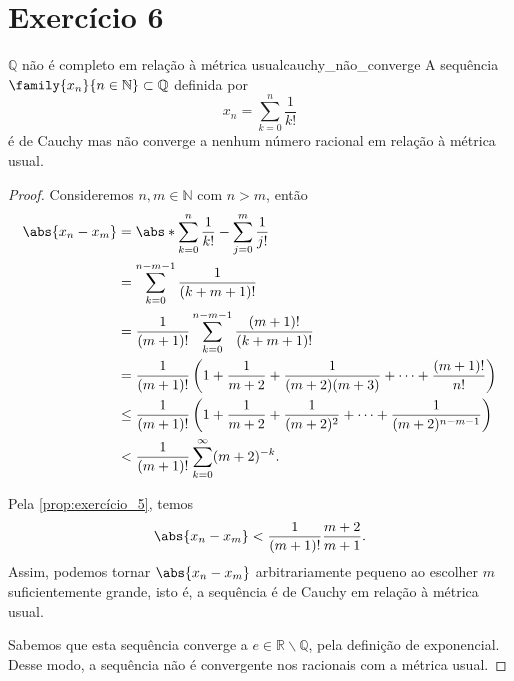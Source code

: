 \section*{Exercício 6}
\begin{proposition}{\(\mathbb{Q}\) não é completo em relação à métrica usual}{cauchy_não_converge}
    A sequência \(\family{x_n}{n\in \mathbb{N}}\subset \mathbb{Q}\) definida por
    \begin{equation*}
        x_n = \sum_{k = 0}^n \frac{1}{k!}
    \end{equation*}
    é de Cauchy mas não converge a nenhum número racional em relação à métrica usual.
\end{proposition}
\begin{proof}
    Consideremos \(n,m \in \mathbb{N}\) com \(n > m\), então
    \begin{align*}
        \abs{x_n - x_m} &= \abs*{\sum_{k=0}^{n}\frac{1}{k!} - \sum_{j = 0}^m\frac{1}{j!}}\\
                        &= \sum_{k=0}^{n-m-1} \frac{1}{(k+m+1)!}\\
                        &= \frac{1}{(m+1)!} \sum_{k=0}^{n-m-1} \frac{(m+1)!}{(k+m+1)!}\\
                        &= \frac{1}{(m+1)!} \left(1 + \frac{1}{m+2} + \frac{1}{(m+2)(m+3)} + \dots + \frac{(m+1)!}{n!}\right)\\
                        &\leq \frac{1}{(m+1)!}\left(1 + \frac{1}{m+2} + \frac{1}{(m+2)^2} + \dots + \frac{1}{(m+2)^{n-m-1}}\right)\\
                        &<\frac{1}{(m+1)!} \sum_{k = 0}^\infty (m+2)^{-k}.
    \end{align*}

    Pela \cref{prop:exercício_5}, temos
    \begin{equation*}
        \abs{x_n - x_m} < \frac{1}{(m+1)!}\frac{m + 2}{m + 1}.
    \end{equation*}
    Assim, podemos tornar \(\abs{x_n - x_m}\) arbitrariamente pequeno ao escolher \(m\) suficientemente grande, isto é, a sequência é de Cauchy em relação à métrica usual.

    Sabemos que esta sequência converge a \(e \in \mathbb{R} \smallsetminus \mathbb{Q}\), pela definição de exponencial. Desse modo, a sequência não é convergente nos racionais com a métrica usual.
\end{proof}
